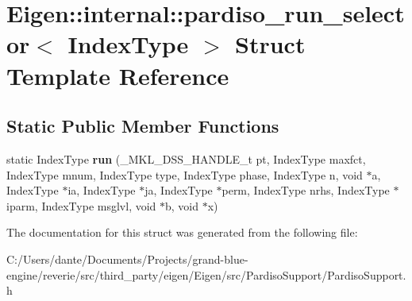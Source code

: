 \hypertarget{struct_eigen_1_1internal_1_1pardiso__run__selector}{}\section{Eigen\+::internal\+::pardiso\+\_\+run\+\_\+selector$<$ Index\+Type $>$ Struct Template Reference}
\label{struct_eigen_1_1internal_1_1pardiso__run__selector}
\subsection*{Static Public Member Functions}
\begin{DoxyCompactItemize}
\item 
\mbox{\label{struct_eigen_1_1internal_1_1pardiso__run__selector_ab9b3df198fa7a73ed2fd7b3a968060a2}} 
static Index\+Type {\bfseries run} (\+\_\+\+M\+K\+L\+\_\+\+D\+S\+S\+\_\+\+H\+A\+N\+D\+L\+E\+\_\+t pt, Index\+Type maxfct, Index\+Type mnum, Index\+Type type, Index\+Type phase, Index\+Type n, void $\ast$a, Index\+Type $\ast$ia, Index\+Type $\ast$ja, Index\+Type $\ast$perm, Index\+Type nrhs, Index\+Type $\ast$iparm, Index\+Type msglvl, void $\ast$b, void $\ast$x)
\end{DoxyCompactItemize}


The documentation for this struct was generated from the following file\+:\begin{DoxyCompactItemize}
\item 
C\+:/\+Users/dante/\+Documents/\+Projects/grand-\/blue-\/engine/reverie/src/third\+\_\+party/eigen/\+Eigen/src/\+Pardiso\+Support/Pardiso\+Support.\+h\end{DoxyCompactItemize}
